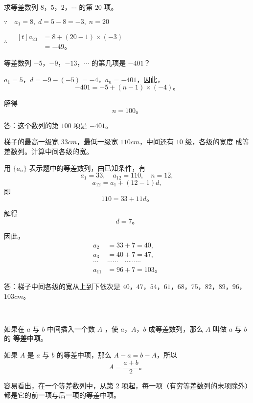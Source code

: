 \liti 求等差数列 $8$，$5$，$2$，$\cdots$ 的第 $20$ 项。

\jie $\because \quad a_1 = 8,\; d = 5 - 8 = -3,\; n = 20$

$\therefore \quad \begin{aligned}[t]
    a_{20} &= 8 + (20 - 1) \times (-3) \\
         &= -49 \text{。}
\end{aligned}$


\liti 等差数列 $-5$，$-9$，$-13$，$\cdots$ 的第几项是 $-401$？

\jie $a_1 = 5$，$d = -9 - (-5) = -4$，$a_n = -401$，因此，
$$ -401 = -5 + (n - 1) \times (-4) \text{。} $$

解得
$$ n = 100 \text{。} $$

答：这个数列的第 $100$ 项是 $-401$。


\liti 梯子的最高一级宽 $33cm$，最低一级宽 $110cm$，中间还有 $10$ 级，各级的宽度
成等差数列。计算中间各级的宽。

\jie 用 $\{a_n\}$ 表示题中的等差数列，由已知条件，有
$$ a_1 = 33,\quad a_{12} = 110,\quad n = 12,$$
$$ a_{12} = a_1 + (12 - 1)d ,$$
即
$$ 110 = 33 + 11d \text{。} $$

解得
$$ d = 7 \text{。} $$

因此，
\begin{align*}
    a_2 &= 33 + 7 = 40, \\
    a_3 &= 40 + 7 = 47, \\
    \cdots&\cdots\cdots \quad \cdots\cdots\cdots \\
    a_{11} &= 96 + 7 = 103 \text{。}
\end{align*}

答：梯子中间各级的宽从上到下依次是 $40$，$47$，$54$，$61$，$68$，$75$，$82$，$89$，$96$，$103cm$。

\,

如果在 $a$ 与 $b$ 中间插入一个数 $A$ ，使 $a$，$A$，$b$ 成等差数列，那么 $A$ 叫做 $a$ 与 $b$ 的 \textbf{等差中项}。

如果 $A$ 是 $a$ 与 $b$ 的等差中项，那么 $A - a = b - A$，所以
$$ A = \dfrac{a + b}{2} \text{。}$$

容易看出，在一个等差数列中，从第 2 项起，每一项（有穷等差数列的末项除外）都是它的前一项与后一项的等差中项。

